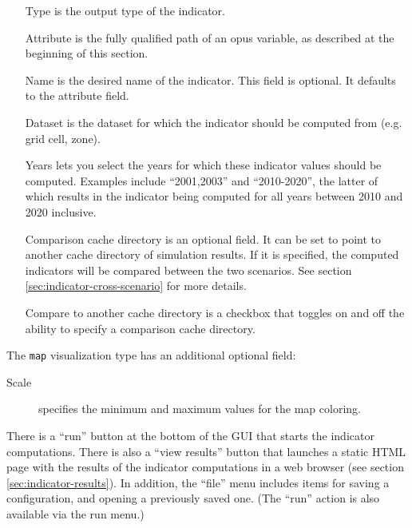 \begin{itemize}
\tight
\item[Type] is the output type of the indicator.

\item[Attribute] is the fully qualified path of an opus variable, as 
described at the beginning of this section. 

\item[Name] is the desired name of the indicator. This field is optional.
It defaults to the attribute field.

\item[Dataset] is the dataset for which the indicator should be 
computed from (e.g. grid cell, zone).

\item[Years] lets you select the years for
which these indicator values should be computed. Examples include
``2001,2003'' and ``2010-2020'', the latter of which results in 
the indicator being computed for all years between 2010 and 2020
inclusive. 

\item[Comparison cache directory] is an optional field. It can 
be set to point to another cache directory of simulation results.
If it is specified, the computed indicators will be compared 
between the two scenarios. See section \ref{sec:indicator-cross-scenario} 
for more details. 

\item[Compare to another cache directory] is a checkbox that toggles
on and off the ability to specify a comparison cache directory.

\end{itemize}

The \verb|map| visualization type has an additional optional field: 
\begin{description}
\item[Scale] specifies the minimum and maximum values for the map coloring. 
\end{description}  

There is a ``run'' button at the bottom of the GUI that starts the indicator 
computations.  There is also a ``view results'' button that launches a 
static HTML page with the results of the indicator computations in a 
web browser (see section \ref{sec:indicator-results}). In
addition, the ``file'' menu includes items for saving a configuration, and
opening a previously saved one.  (The ``run'' action is also available via
the run menu.) 

